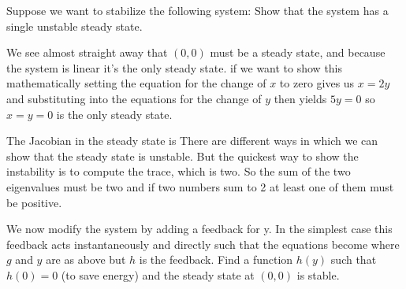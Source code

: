 Suppose we want to stabilize the following system:
\subquestion 
Show that the system has a single unstable steady state.

\solution  
We see almost straight away that $(0,0)$ must be a steady state, and because the system is linear it's the only steady state. if we want to show this mathematically setting the equation for the change of $x$ to zero gives us $x=2y$ and substituting into the equations for the change of $y$ then yields $5y=0$ so $x=y=0$ is the only steady state. 

The Jacobian in the steady state is 
There are different ways in which we can show that the steady state is unstable. But the quickest way to show the instability is to compute the trace, which is two. So the sum of the two eigenvalues must be two and if two numbers sum to 2 at least one of them must be positive. 

\subquestion 
We now modify the system by adding a feedback for y. In the simplest case this feedback acts instantaneously and directly such that the equations become
where $g$ and $y$ are as above but $h$ is the feedback. Find a function $h(y)$ such that $h(0)=0$ (to save energy) and the steady state at $(0,0)$ is stable. 

